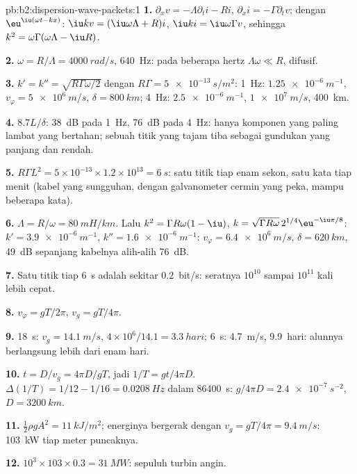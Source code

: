 \begin{solution}{pb:b2:dispersion-wave-packets:1}
\textbf{1.} $\partial_xv = -\Lambda\partial_ti - Ri$, $\partial_xi = -\Gamma\partial_tv$; dengan
$\eu^{\iu(\omega t - kx)}$: $\iu kv = (\iu\omega\Lambda + R)i$, $\iu ki = \iu\omega\Gamma v$, sehingga
$k^2 = \omega\Gamma(\omega\Lambda - \iu R)$.

\textbf{2.} $\omega = R/\Lambda = \qty{4000}{rad/s}$, \qty{640}{Hz}: pada beberapa hertz $\Lambda\omega
\ll R$, difusif.

\textbf{3.} $k' = k'' = \sqrt{R\Gamma\omega/2}$ dengan $R\Gamma = \qty{5e-13}{s/m^2}$: \qty{1}{Hz}:
$\qty{1.25e-6}{m^{-1}}$, $v_\varphi = \qty{5e6}{m/s}$, $\delta = \qty{800}{km}$; \qty{4}{Hz}:
$\qty{2.5e-6}{m^{-1}}$, $\qty{1e7}{m/s}$, \qty{400}{km}.

\textbf{4.} $8.7L/\delta$: \qty{38}{dB} pada \qty{1}{Hz}, \qty{76}{dB} pada \qty{4}{Hz}: hanya
komponen yang paling lambat yang bertahan; sebuah titik yang tajam tiba sebagai gundukan yang panjang dan rendah.

\textbf{5.} $R\Gamma L^2 = 5 \times 10^{-13} \times 1.2 \times 10^{13} = \qty{6}{s}$: satu titik tiap
enam sekon, satu kata tiap menit (kabel yang sungguhan, dengan galvanometer cermin
yang peka, mampu beberapa kata).

\textbf{6.} $\Lambda = R/\omega = \qty{80}{mH/km}$. Lalu $k^2 = \Gamma R\omega(1 - \iu)$, $k = \sqrt{\Gamma R\omega}
\,2^{1/4}\eu^{-\iu\pi/8}$: $k' = \qty{3.9e-6}{m^{-1}}$, $k'' = \qty{1.6e-6}{m^{-1}}$: $v_\varphi =
\qty{6.4e6}{m/s}$, $\delta = \qty{620}{km}$, \qty{49}{dB} sepanjang kabelnya alih-alih
\qty{76}{dB}.

\textbf{7.} Satu titik tiap \qty{6}{s} adalah sekitar \qty{0.2}{bit/s}: seratnya
$10^{10}$ sampai $10^{11}$ kali lebih cepat.

\textbf{8.} $v_\varphi = gT/2\pi$, $v_g = gT/4\pi$.

\textbf{9.} \qty{18}{s}: $v_g = \qty{14.1}{m/s}$, $4 \times 10^6/14.1 = \qty{3.3}{hari}$;
\qty{6}{s}: \qty{4.7}{m/s}, \qty{9.9}{hari}: alunnya berlangsung lebih dari enam hari.

\textbf{10.} $t = D/v_g = 4\pi D/gT$, jadi $1/T = gt/4\pi D$. $\Delta(1/T) = 1/12 - 1/16
= \qty{0.0208}{Hz}$ dalam \qty{86400}{s}: $g/4\pi D = \qty{2.4e-7}{s^{-2}}$, $D = \qty{3200}{km}$.

\textbf{11.} $\tfrac12\rho gA^2 = \qty{11}{kJ/m^2}$; energinya bergerak dengan $v_g = gT/4\pi =
\qty{9.4}{m/s}$: \qty{103}{kW} tiap meter puncaknya.

\textbf{12.} $10^3 \times 103 \times 0.3 = \qty{31}{MW}$: sepuluh turbin angin.


\end{solution}
